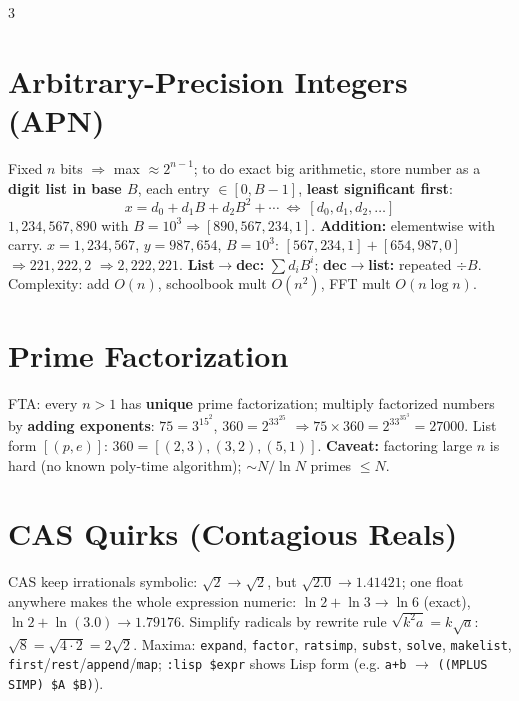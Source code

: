 \documentclass[9pt]{extarticle}
\newcommand{\hl}[1]{\textbf{\textcolor{BrickRed}{#1}}}
\begin{document}
\begin{multicols}{3}
\section{Arbitrary-Precision Integers (APN)}
Fixed $n$ bits $\Rightarrow$ max $\approx 2^{n-1}$; to do exact big arithmetic, store number as a \hl{digit list in base $B$}, each entry $\in[0,B-1]$, \hl{least significant first}:
{\setlength{\abovedisplayskip}{1.5pt}\setlength{\belowdisplayskip}{1.5pt}\setlength{\abovedisplayshortskip}{0.75pt}\setlength{\belowdisplayshortskip}{0.75pt}
$$x=d_0+d_1B+d_2B^2+\cdots\ \Longleftrightarrow\ [d_0,d_1,d_2,\ldots]$$}
$1{,}234{,}567{,}890$ with $B{=}10^3\Rightarrow[890,567,234,1]$. \hl{Addition:} elementwise with carry. $x{=}1{,}234{,}567$, $y{=}987{,}654$, $B{=}10^3$: $[567,234,1]+[654,987,0]$ $\Rightarrow 221,222,2$ $\Rightarrow 2{,}222{,}221$. \hl{List$\to$dec:} $\sum d_iB^i$; \hl{dec$\to$list:} repeated $\div B$. Complexity: add $O(n)$, schoolbook mult $O(n^2)$, FFT mult $O(n\log n)$.

\section{Prime Factorization}
FTA: every $n>1$ has \hl{unique} prime factorization; multiply factorized numbers by \hl{adding exponents}: $75=3^15^2$, $360=2^33^25$ $\Rightarrow75\times360=2^33^35^3=27000$. List form $[(p,e)]$: $360=[(2,3),(3,2),(5,1)]$. \hl{Caveat:} factoring large $n$ is hard (no known poly-time algorithm); $\sim N/\ln N$ primes $\le N$.

\section{CAS Quirks (Contagious Reals)}
CAS keep irrationals symbolic: $\sqrt2\to\sqrt2$, but \hl{$\sqrt{2.0}\to1.41421$}; one float anywhere makes the whole expression numeric: $\ln2+\ln3\to\ln6$ (exact), $\ln2+\ln(3.0)\to1.79176$. Simplify radicals by rewrite rule $\sqrt{k^2a}=k\sqrt a$: $\sqrt8=\sqrt{4\cdot2}=2\sqrt2$. Maxima: \texttt{expand}, \texttt{factor}, \texttt{ratsimp}, \texttt{subst}, \texttt{solve}, \texttt{makelist}, \texttt{first}/\texttt{rest}/\texttt{append}/\texttt{map}; \texttt{:lisp \$expr} shows Lisp form (e.g. \texttt{a+b} $\to$ \texttt{((MPLUS SIMP) \$A \$B)}).


\end{multicols}
\end{document}
